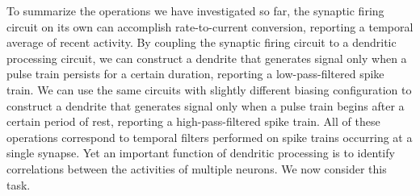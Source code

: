 \documentclass[twocolumn]{article}
\begin{document}
To summarize the operations we have investigated so far, the synaptic firing circuit on its own can accomplish rate-to-current conversion, reporting a temporal average of recent activity. By coupling the synaptic firing circuit to a dendritic processing circuit, we can construct a dendrite that generates signal only when a pulse train persists for a certain duration, reporting a low-pass-filtered spike train. We can use the same circuits with slightly different biasing configuration to construct a dendrite that generates signal only when a pulse train begins after a certain period of rest, reporting a high-pass-filtered spike train. All of these operations correspond to temporal filters performed on spike trains occurring at a single synapse. Yet an important function of dendritic processing is to identify correlations between the activities of multiple neurons. We now consider this task.
\end{document}
